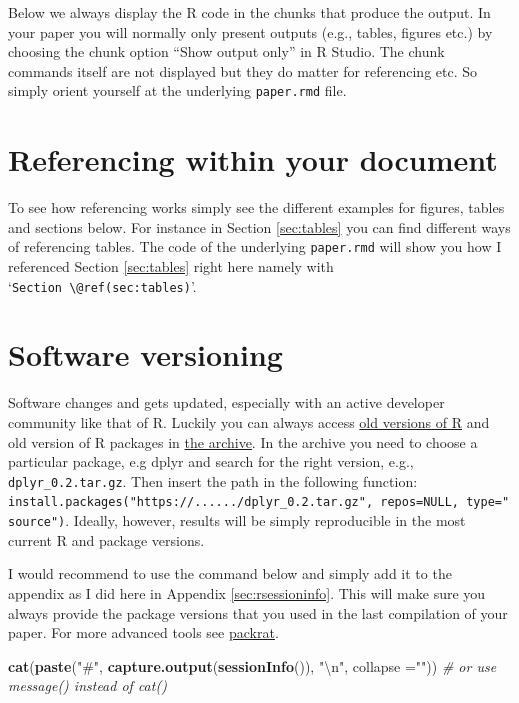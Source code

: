 \documentclass[
  12pt,
]{article}
\newenvironment{Shaded}{\begin{snugshade}}{\end{snugshade}}
\newcommand{\CharTok}[1]{\textcolor[rgb]{0.31,0.60,0.02}{#1}}
\newcommand{\CommentTok}[1]{\textcolor[rgb]{0.56,0.35,0.01}{\textit{#1}}}
\newcommand{\DataTypeTok}[1]{\textcolor[rgb]{0.13,0.29,0.53}{#1}}
\newcommand{\KeywordTok}[1]{\textcolor[rgb]{0.13,0.29,0.53}{\textbf{#1}}}
\newcommand{\NormalTok}[1]{#1}
\newcommand{\StringTok}[1]{\textcolor[rgb]{0.31,0.60,0.02}{#1}}
\begin{document}
Below we always display the R code in the chunks that produce the output. In your paper you will normally only present outputs (e.g., tables, figures etc.) by choosing the chunk option ``Show output only'' in R Studio. The chunk commands itself are not displayed but they do matter for referencing etc. So simply orient yourself at the underlying \texttt{paper.rmd} file.

\hypertarget{referencing-within-your-document}{%
\section{Referencing within your document}\label{referencing-within-your-document}}

To see how referencing works simply see the different examples for figures, tables and sections below. For instance in Section \ref{sec:tables} you can find different ways of referencing tables. The code of the underlying \texttt{paper.rmd} will show you how I referenced Section \ref{sec:tables} right here namely with `\texttt{Section\ \textbackslash{}@ref(sec:tables)}'.

\hypertarget{software-versioning}{%
\section{Software versioning}\label{software-versioning}}

Software changes and gets updated, especially with an active developer community like that of R. Luckily you can always access \href{https://cran.r-project.org/bin/windows/base/old/}{old versions of R} and old version of R packages in \href{https://cran.r-project.org/src/contrib/Archive/}{the archive}. In the archive you need to choose a particular package, e.g dplyr and search for the right version, e.g., \texttt{dplyr\_0.2.tar.gz}. Then insert the path in the following function: \texttt{install.packages("https://....../dplyr\_0.2.tar.gz",\ repos=NULL,\ type="source")}. Ideally, however, results will be simply reproducible in the most current R and package versions.

I would recommend to use the command below and simply add it to the appendix as I did here in Appendix \ref{sec:rsessioninfo}. This will make sure you always provide the package versions that you used in the last compilation of your paper. For more advanced tools see \href{https://rstudio.github.io/packrat/}{packrat}.

\begin{Shaded}
\begin{Highlighting}[]
\KeywordTok{cat}\NormalTok{(}\KeywordTok{paste}\NormalTok{(}\StringTok{"#"}\NormalTok{, }\KeywordTok{capture.output}\NormalTok{(}\KeywordTok{sessionInfo}\NormalTok{()), }\StringTok{"}\CharTok{\textbackslash{}n}\StringTok{"}\NormalTok{, }\DataTypeTok{collapse =}\StringTok{""}\NormalTok{)) }
  \CommentTok{# or use message() instead of cat()}
\end{Highlighting}
\end{Shaded}
\end{document}
